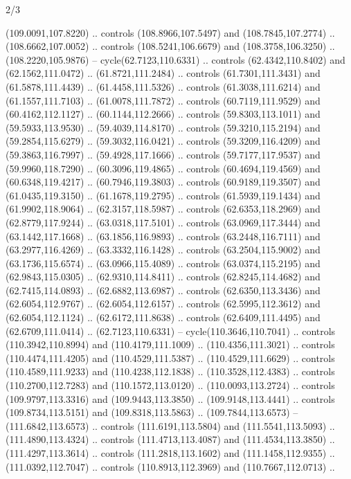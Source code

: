 \begin{flagdescription}{2/3}
\begin{scope}[shift={(0.5\flaglength,0.5)},scale=\flagwidth/320]
\begin{scope}[y=0.8pt, x=0.8pt, yscale=-1,shift={(-118.3,-146)}]
  (109.0091,107.8220) .. controls (108.8966,107.5497) and (108.7845,107.2774) ..
  (108.6662,107.0052) .. controls (108.5241,106.6679) and (108.3758,106.3250) ..
  (108.2220,105.9876) -- cycle(62.7123,110.6331) .. controls (62.4342,110.8402)
  and (62.1562,111.0472) .. (61.8721,111.2484) .. controls (61.7301,111.3431)
  and (61.5878,111.4439) .. (61.4458,111.5326) .. controls (61.3038,111.6214)
  and (61.1557,111.7103) .. (61.0078,111.7872) .. controls (60.7119,111.9529)
  and (60.4162,112.1127) .. (60.1144,112.2666) .. controls (59.8303,113.1011)
  and (59.5933,113.9530) .. (59.4039,114.8170) .. controls (59.3210,115.2194)
  and (59.2854,115.6279) .. (59.3032,116.0421) .. controls (59.3209,116.4209)
  and (59.3863,116.7997) .. (59.4928,117.1666) .. controls (59.7177,117.9537)
  and (59.9960,118.7290) .. (60.3096,119.4865) .. controls (60.4694,119.4569)
  and (60.6348,119.4217) .. (60.7946,119.3803) .. controls (60.9189,119.3507)
  and (61.0435,119.3150) .. (61.1678,119.2795) .. controls (61.5939,119.1434)
  and (61.9902,118.9064) .. (62.3157,118.5987) .. controls (62.6353,118.2969)
  and (62.8779,117.9244) .. (63.0318,117.5101) .. controls (63.0969,117.3444)
  and (63.1442,117.1668) .. (63.1856,116.9893) .. controls (63.2448,116.7111)
  and (63.2977,116.4269) .. (63.3332,116.1428) .. controls (63.2504,115.9002)
  and (63.1736,115.6574) .. (63.0966,115.4089) .. controls (63.0374,115.2195)
  and (62.9843,115.0305) .. (62.9310,114.8411) .. controls (62.8245,114.4682)
  and (62.7415,114.0893) .. (62.6882,113.6987) .. controls (62.6350,113.3436)
  and (62.6054,112.9767) .. (62.6054,112.6157) .. controls (62.5995,112.3612)
  and (62.6054,112.1124) .. (62.6172,111.8638) .. controls (62.6409,111.4495)
  and (62.6709,111.0414) .. (62.7123,110.6331) -- cycle(110.3646,110.7041) ..
  controls (110.3942,110.8994) and (110.4179,111.1009) .. (110.4356,111.3021) ..
  controls (110.4474,111.4205) and (110.4529,111.5387) .. (110.4529,111.6629) ..
  controls (110.4589,111.9233) and (110.4238,112.1838) .. (110.3528,112.4383) ..
  controls (110.2700,112.7283) and (110.1572,113.0120) .. (110.0093,113.2724) ..
  controls (109.9797,113.3316) and (109.9443,113.3850) .. (109.9148,113.4441) ..
  controls (109.8734,113.5151) and (109.8318,113.5863) .. (109.7844,113.6573) --
  (111.6842,113.6573) .. controls (111.6191,113.5804) and (111.5541,113.5093) ..
  (111.4890,113.4324) .. controls (111.4713,113.4087) and (111.4534,113.3850) ..
  (111.4297,113.3614) .. controls (111.2818,113.1602) and (111.1458,112.9355) ..
  (111.0392,112.7047) .. controls (110.8913,112.3969) and (110.7667,112.0713) ..

\end{scope}
\end{scope}
\end{flagdescription}

